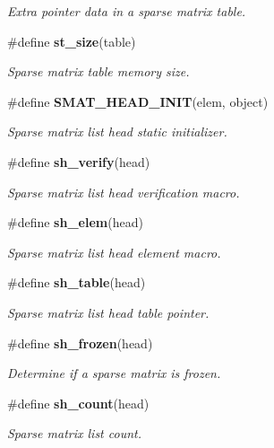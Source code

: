 \begin{CompactItemize}
\begin{CompactList}\small\item\em Extra pointer data in a sparse matrix table.\item\end{CompactList}\item 
\#define {\bf st\_\-size}(table)
\begin{CompactList}\small\item\em Sparse matrix table memory size.\item\end{CompactList}\item 
\#define {\bf SMAT\_\-HEAD\_\-INIT}(elem, object)
\begin{CompactList}\small\item\em Sparse matrix list head static initializer.\item\end{CompactList}\item 
\#define {\bf sh\_\-verify}(head)
\begin{CompactList}\small\item\em Sparse matrix list head verification macro.\item\end{CompactList}\item 
\#define {\bf sh\_\-elem}(head)
\begin{CompactList}\small\item\em Sparse matrix list head element macro.\item\end{CompactList}\item 
\#define {\bf sh\_\-table}(head)
\begin{CompactList}\small\item\em Sparse matrix list head table pointer.\item\end{CompactList}\item 
\#define {\bf sh\_\-frozen}(head)
\begin{CompactList}\small\item\em Determine if a sparse matrix is frozen.\item\end{CompactList}\item 
\#define {\bf sh\_\-count}(head)
\begin{CompactList}\small\item\em Sparse matrix list count.\item\end{CompactList}\item 

\end{CompactItemize}
